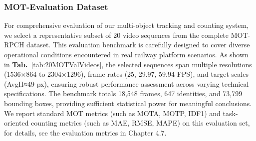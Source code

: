 \subsubsection{MOT-Evaluation Dataset}
For comprehensive evaluation of our multi-object tracking and counting system, we select a representative subset of 20 video sequences from the complete MOT-RPCH dataset. This evaluation benchmark is carefully designed to cover diverse operational conditions encountered in real railway platform scenarios. As shown in \textbf{Tab.}~\ref{tab:20MOTValVideos}, the selected sequences span multiple resolutions (1536×864 to 2304×1296), frame rates (25, 29.97, 59.94 FPS), and target scales (AvgH≈49 px), ensuring robust performance assessment across varying technical specifications. The benchmark totals 18,548 frames, 647 identities, and 73,799 bounding boxes, providing sufficient statistical power for meaningful conclusions. We report standard MOT metrics (such as MOTA, MOTP, IDF1) and task-oriented counting metrics (such as MAE, RMSE, MAPE) on this evaluation set, for details, see the evaluation metrics in Chapter 4.7.
